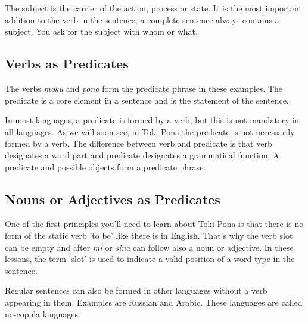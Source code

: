The subject is the carrier of the action, process or state. 
It is the most important addition to the verb in the sentence, a complete sentence always contains a subject. 
You ask for the subject with whom or what.

%
\subsection*{Verbs as Predicates}
%

The verbs \textit{moku} and \textit{pona} form the predicate phrase in these examples.  
The predicate is a core element in a sentence and is the statement of the sentence. 

In most languages, a predicate is formed by a verb, but this is not mandatory in all languages. 
As we will soon see, in Toki Pona the predicate is not necessarily formed by a verb. 
The difference between verb and predicate is that verb designates a word part and predicate designates a grammatical function.
A predicate and possible objects form a predicate phrase. 
%
\subsection*{Nouns or Adjectives as Predicates}
%
%
%
One of the first principles you'll need to learn about Toki Pona is that there is no form of the static verb 'to be' like there is in English. 
That's why the verb slot can be empty and after \textit{mi} or \textit{sina} can follow also a noun or adjective. 
In these lessons, the term 'slot' is used to indicate a valid position of a word type in the sentence.

Regular sentences can also be formed in other languages without a verb appearing in them. 
Examples are Russian and Arabic. 
These languages are called no-copula languages. 

